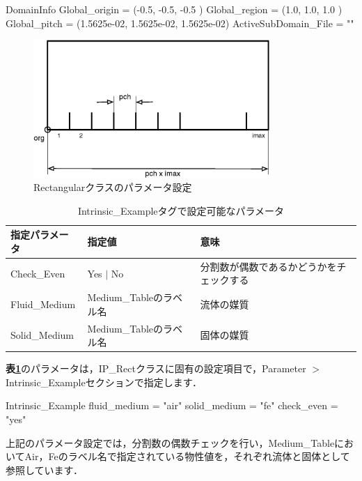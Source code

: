 {\small
\begin{program}
DomainInfo {
  Global_origin   = (-0.5, -0.5, -0.5   )
  Global_region   = (1.0,  1.0,  1.0    )
  Global_pitch    = (1.5625e-02, 1.5625e-02, 1.5625e-02)
  ActiveSubDomain_File = ""
}
\end{program}
}


\begin{figure}[htdp]
\begin{center}
\includegraphics[width=9cm,clip]{rect.eps}
\caption{Rectangularクラスのパラメータ設定}
\label{fig:rect intrinsic class}
\end{center}
\end{figure}


\begin{table}[htdp]
\caption{Intrinsic\_Exampleタグで設定可能なパラメータ}
\begin{center}
\small
\begin{tabular}{lll}\toprule
指定パラメータ & 指定値 & 意味\\ \midrule
Check\_Even & Yes $|$ No & 分割数が偶数であるかどうかをチェックする\\
Fluid\_Medium & Medium\_Tableのラベル名 & 流体の媒質\\
Solid\_Medium & Medium\_Tableのラベル名 & 固体の媒質\\
\bottomrule
\end{tabular}
\end{center}
\label{tbl:rect parameter}
\end{table}

\textbf{表\ref{tbl:rect parameter}}のパラメータは，IP\_Rectクラスに固有の設定項目で，Parameter $>$ Intrinsic\_Exampleセクションで指定します．

{ \small
\begin{program}
  Intrinsic_Example {
    fluid_medium = "air"
    solid_medium = "fe"
    check_even = "yes"
  }
\end{program}
}

上記のパラメータ設定では，分割数の偶数チェックを行い，Medium\_TableにおいてAir，Feのラベル名で指定されている物性値を，それぞれ流体と固体として参照しています．



